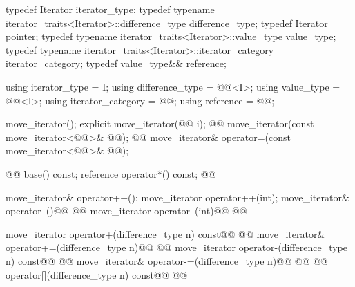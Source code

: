 %
\begin{codeblock}
namespace std { @@
  template <@@>
  class move_iterator {
  public:
\end{codeblock}\begin{removedblock}\begin{codeblock}
    typedef Iterator                                              iterator_type;
    typedef typename iterator_traits<Iterator>::difference_type   difference_type;
    typedef Iterator                                              pointer;
    typedef typename iterator_traits<Iterator>::value_type        value_type;
    typedef typename iterator_traits<Iterator>::iterator_category iterator_category;
    typedef value_type&&                                          reference;
\end{codeblock}\end{removedblock}\begin{addedblock}\begin{codeblock}
    using iterator_type     = I;
    using difference_type   = @@<I>;
    using value_type        = @@<I>;
    using iterator_category = @@;
    using reference         = @\newtxt{\seebelow}@;
\end{codeblock}\end{addedblock}\begin{codeblock}

    move_iterator();
    explicit move_iterator(@@ i);
    @@
    move_iterator(const move_iterator<@@>& @@);
    @@
    move_iterator& operator=(const move_iterator<@@>& @@);

    @@ base() const;
    reference operator*() const;
    @@

    move_iterator& operator++();
    move_iterator operator++(int);
    move_iterator& operator--()@\removed{;}@
      @@
    move_iterator operator--(int)@\removed{;}@
      @@

    move_iterator operator+(difference_type n) const@\removed{;}@
      @@
    move_iterator& operator+=(difference_type n)@\removed{;}@
      @@
    move_iterator operator-(difference_type n) const@\removed{;}@
      @@
    move_iterator& operator-=(difference_type n)@\removed{;}@
      @@
    @\removed{\unspec}@ operator[](difference_type n) const@\removed{;}@
      @@


\end{codeblock}
